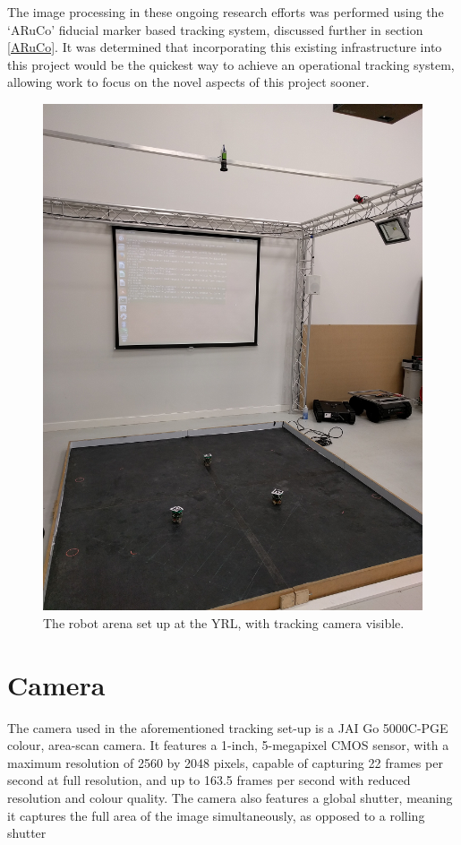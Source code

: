 The image processing in these ongoing research efforts was performed using the `ARuCo\cite{Garrido:2014}' fiducial marker based tracking system, discussed further in section \ref{ARuCo}. It was determined that incorporating this existing infrastructure into this project would be the quickest way to achieve an operational tracking system, allowing work to focus on the novel aspects of this project sooner.

\begin{figure}
	\centering
	\includegraphics[scale=0.4]{Figures/ArenaPhoto.png}
	\decoRule
	\caption[Robot Arena and Tracking Camera]{The robot arena set up at the YRL, with tracking camera visible.}
	\label{fig:ArenaPhoto}
\end{figure}


\section{Camera}
The camera used in the aforementioned tracking set-up is a JAI Go 5000C-PGE colour, area-scan camera. It features a 1-inch, 5-megapixel CMOS sensor, with a maximum resolution of 2560 by 2048 pixels, capable of capturing 22 frames per second at full resolution, and up to 163.5 frames per second with reduced resolution and colour quality. The camera also features a global shutter, meaning it captures the full area of the image simultaneously, as opposed to a rolling shutter 


